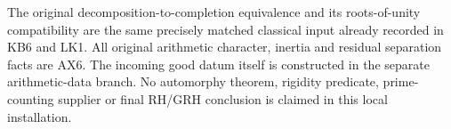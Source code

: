 The original decomposition-to-completion equivalence and
its roots-of-unity compatibility are the same precisely
matched classical input already recorded in KB6 and LK1.
All original arithmetic character, inertia and residual
separation facts are AX6.  The incoming good datum itself
is constructed in the separate arithmetic-data branch.
No automorphy theorem, rigidity predicate, prime-counting
supplier or final RH/GRH conclusion is claimed in this
local installation.
